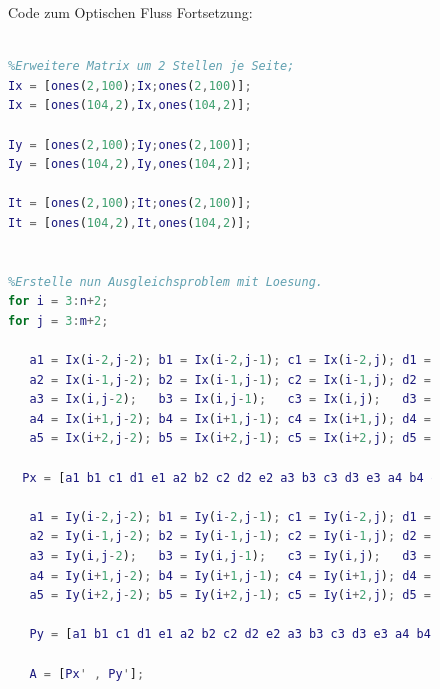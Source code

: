 \documentclass[12pt,a4paper,oneside]{article}
\begin{document}
\begin{figure} 

Code zum Optischen Fluss Fortsetzung:
\begin{lstlisting}[language=Matlab,
frame=single,breaklines=true,keepspaces=true]

%Erweitere Matrix um 2 Stellen je Seite;
Ix = [ones(2,100);Ix;ones(2,100)];
Ix = [ones(104,2),Ix,ones(104,2)];

Iy = [ones(2,100);Iy;ones(2,100)];
Iy = [ones(104,2),Iy,ones(104,2)];

It = [ones(2,100);It;ones(2,100)];
It = [ones(104,2),It,ones(104,2)];


%Erstelle nun Ausgleichsproblem mit Loesung.
for i = 3:n+2;
for j = 3:m+2;
    
   a1 = Ix(i-2,j-2); b1 = Ix(i-2,j-1); c1 = Ix(i-2,j); d1 = Ix(i-2,j+1); e1 = Ix(i-2,j+2);
   a2 = Ix(i-1,j-2); b2 = Ix(i-1,j-1); c2 = Ix(i-1,j); d2 = Ix(i-1,j+1); e2 = Ix(i-1,j+2);
   a3 = Ix(i,j-2);   b3 = Ix(i,j-1);   c3 = Ix(i,j);   d3 = Ix(i,j+1);   e3 = Ix(i,j+2);
   a4 = Ix(i+1,j-2); b4 = Ix(i+1,j-1); c4 = Ix(i+1,j); d4 = Ix(i+1,j+1); e4 = Ix(i+1,j+2);
   a5 = Ix(i+2,j-2); b5 = Ix(i+2,j-1); c5 = Ix(i+2,j); d5 = Ix(i+2,j+1); e5 = Ix(i+2,j+2);
    
  Px = [a1 b1 c1 d1 e1 a2 b2 c2 d2 e2 a3 b3 c3 d3 e3 a4 b4 c4 d4 e4 a5 b5 c5 d5 e5];
  
   a1 = Iy(i-2,j-2); b1 = Iy(i-2,j-1); c1 = Iy(i-2,j); d1 = Iy(i-2,j+1); e1 = Iy(i-2,j+2);
   a2 = Iy(i-1,j-2); b2 = Iy(i-1,j-1); c2 = Iy(i-1,j); d2 = Iy(i-1,j+1); e2 = Iy(i-1,j+2);
   a3 = Iy(i,j-2);   b3 = Iy(i,j-1);   c3 = Iy(i,j);   d3 = Iy(i,j+1);   e3 = Iy(i,j+2);
   a4 = Iy(i+1,j-2); b4 = Iy(i+1,j-1); c4 = Iy(i+1,j); d4 = Iy(i+1,j+1); e4 = Iy(i+1,j+2);
   a5 = Iy(i+2,j-2); b5 = Iy(i+2,j-1); c5 = Iy(i+2,j); d5 = Iy(i+2,j+1); e5 = Iy(i+2,j+2);
   
   Py = [a1 b1 c1 d1 e1 a2 b2 c2 d2 e2 a3 b3 c3 d3 e3 a4 b4 c4 d4 e4 a5 b5 c5 d5 e5];
   
   A = [Px' , Py'];
 
\end{lstlisting}




\end{figure} 

\newpage
\end{document}
